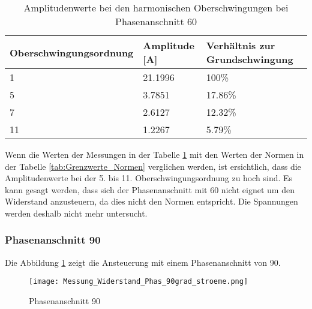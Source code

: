 \begin{table}[ht!]
	\centering
	\begin{tabular}{|l|l|l|}
		\hline
		Oberschwingungsordnung & Amplitude [A] 	& Verhältnis zur Grundschwingung	\\ \hline
		1                      & 21.1996   		& 100\%								\\ \hline
		5                      & 3.7851    		& 17.86\%							\\ \hline
		7                      & 2.6127    		& 12.32\%							\\ \hline
		11                     & 1.2267    		& 5.79\%							\\ \hline
	\end{tabular}
	\caption{Amplitudenwerte bei den harmonischen Oberschwingungen bei Phasenanschnitt 60\textdegree}\label{tab:Phas_60_Stroeme}
\end{table}

Wenn die Werten der Messungen in der Tabelle \ref{tab:Phas_60_Stroeme} mit den Werten der Normen in der Tabelle \ref{tab:Grenzwerte_Normen} verglichen werden, ist ersichtlich, dass die Amplitudenwerte bei der 5. bis 11. Oberschwingungsordnung zu hoch sind. Es kann gesagt werden, dass sich der Phasenanschnitt mit 60\textdegree \hspace{0.02cm} nicht eignet um den Widerstand anzusteuern, da dies nicht den Normen entspricht. Die Spannungen werden deshalb nicht mehr untersucht. 


\subsubsection*{Phasenanschnitt 90\textdegree}

Die Abbildung \ref{fig:Mess_Widerstand_Phas_90grad_stroeme} zeigt die Ansteuerung mit einem Phasenanschnitt von 90\textdegree \hspace{0.02cm}. 

\begin{figure}[ht!]
	\centering
	\texttt{[image: Messung\_Widerstand\_Phas\_90grad\_stroeme.png]}	
	\caption{Phasenanschnitt 90\textdegree}\label{fig:Mess_Widerstand_Phas_90grad_stroeme}
\end{figure}

